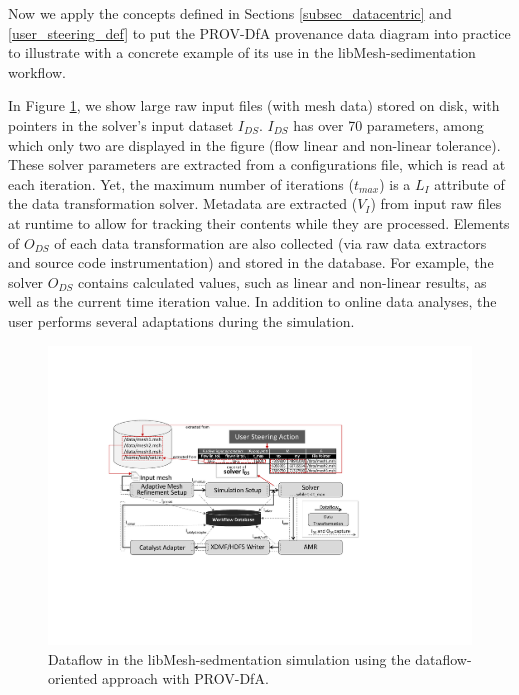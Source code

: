 

Now we apply the concepts defined in Sections \ref{subsec_datacentric} and \ref{user_steering_def}
to put the PROV-DfA provenance data diagram into practice to illustrate with a concrete example of its use in the libMesh-sedimentation workflow.

In Figure \ref{fig:libmesh_with_provdfa}, we show large raw input files (with mesh data) stored on disk,
with pointers in the solver's input dataset $I_{DS}$.
$I_{DS}$ has over 70 parameters, among which only two are displayed in the figure
(flow linear and non-linear tolerance).
These solver parameters are extracted from a configurations file, which is
read at each iteration.
Yet, the maximum number of iterations ($t_{max}$) is a $L_I$ attribute of the
data transformation solver.
Metadata are extracted ($V_I$) from input raw files at runtime to allow for tracking
their contents while they are processed.
Elements of $O_{DS}$ of each data transformation are also collected
(via raw data extractors and source code instrumentation) and stored in the database.
For example, the solver $O_{DS}$ contains calculated values,
such as linear and non-linear results, as well as the current time iteration value.
In addition to online data analyses, the user performs several adaptations during the simulation.

\begin{figure}[H]
    \centering
    \includegraphics[width=\textwidth,keepaspectratio]{img/steeringaction-provdfa.pdf}
    \caption{Dataflow in the libMesh-sedmentation simulation using the dataflow-oriented approach with PROV-DfA.}
    \label{fig:libmesh_with_provdfa}
\end{figure}

